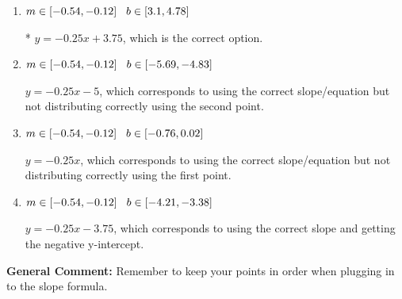\documentclass{extbook}[14pt]
\begin{document}
\begin{enumerate}
{\begin{enumerate}[label=\Alph*.]
 $y = 0.25x + 0.25$, which corresponds to using the negative slope and the correct equation.
\item \( m \in [-0.54, -0.12] \hspace*{3mm} b \in [3.1, 4.78] \)

* $y = -0.25x + 3.75$, which is the correct option.
\item \( m \in [-0.54, -0.12] \hspace*{3mm} b \in [-5.69, -4.83] \)

 $y = -0.25x -5$, which corresponds to using the correct slope/equation but not distributing correctly using the second point.
\item \( m \in [-0.54, -0.12] \hspace*{3mm} b \in [-0.76, 0.02] \)

 $y = -0.25x$, which corresponds to using the correct slope/equation but not distributing correctly using the first point.
\item \( m \in [-0.54, -0.12] \hspace*{3mm} b \in [-4.21, -3.38] \)

 $y = -0.25x -3.75$, which corresponds to using the correct slope and getting the negative y-intercept.
\end{enumerate}

\textbf{General Comment:} Remember to keep your points in order when plugging in to the slope formula.
}
\end{enumerate}
\end{document}
